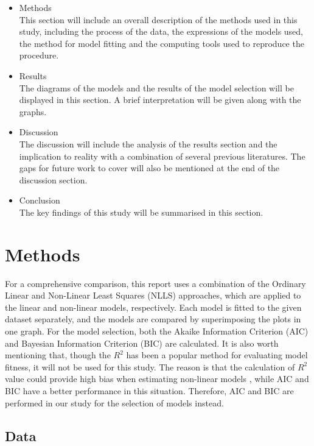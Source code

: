 \documentclass[11pt, oneside]{article}
\begin{document}
	\begin{itemize}
	\item Methods
	\\This section will include an overall description of the methods used in this study, including the process of the data, the expressions of the models used, the method for model fitting and the computing tools used to reproduce the procedure.
	\item Results
	\\The diagrams of the models and the results of the model selection will be displayed in this section. A brief interpretation will be given along with the graphs.
	\item Discussion
	\\The discussion will include the analysis of the results section and the implication to reality with a combination of several previous literatures. The gaps for future work to cover will also be mentioned at the end of the discussion section.
	\item Conclusion
	\\The key findings of this study will be summarised in this section.
	\end{itemize}

	\pagebreak

	\section{Methods}


	For a comprehensive comparison, this report uses a combination of the Ordinary Linear and Non-Linear Least Squares (NLLS) approaches, which are applied to the linear and non-linear models, respectively. Each model is fitted to the given dataset separately, and the models are compared by superimposing the plots in one graph. For the model selection, both the Akaike Information Criterion (AIC) and Bayesian Information Criterion (BIC) are calculated. It is also worth mentioning that, though the \(R^2\) has been a popular method for evaluating model fitness, it will not be used for this study. The reason is that the calculation of \(R^2\) value could provide high bias when estimating non-linear models \cite{spiess2010evaluation}, while AIC and BIC have a better performance in this situation. Therefore, AIC and BIC are performed in our study for the selection of models instead.

 		\subsection{Data}
 
\end{document}
